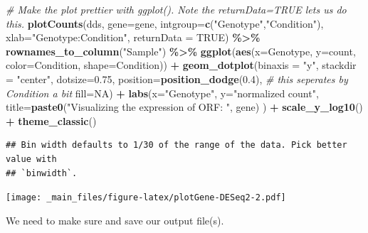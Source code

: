 \documentclass[
]{book}
\newenvironment{Shaded}{\begin{snugshade}}{\end{snugshade}}
\newcommand{\AttributeTok}[1]{\textcolor[rgb]{0.13,0.29,0.53}{#1}}
\newcommand{\CommentTok}[1]{\textcolor[rgb]{0.56,0.35,0.01}{\textit{#1}}}
\newcommand{\ConstantTok}[1]{\textcolor[rgb]{0.56,0.35,0.01}{#1}}
\newcommand{\FloatTok}[1]{\textcolor[rgb]{0.00,0.00,0.81}{#1}}
\newcommand{\FunctionTok}[1]{\textcolor[rgb]{0.13,0.29,0.53}{\textbf{#1}}}
\newcommand{\NormalTok}[1]{#1}
\newcommand{\SpecialCharTok}[1]{\textcolor[rgb]{0.81,0.36,0.00}{\textbf{#1}}}
\newcommand{\StringTok}[1]{\textcolor[rgb]{0.31,0.60,0.02}{#1}}
\begin{document}
\begin{Shaded}
\begin{Highlighting}[]
\CommentTok{\# Make the plot prettier with ggplot(). Note the returnData=TRUE let\textquotesingle{}s us do this.}
\FunctionTok{plotCounts}\NormalTok{(dds, }\AttributeTok{gene=}\NormalTok{gene, }\AttributeTok{intgroup=}\FunctionTok{c}\NormalTok{(}\StringTok{"Genotype"}\NormalTok{,}\StringTok{"Condition"}\NormalTok{),}
           \AttributeTok{xlab=}\StringTok{"Genotype:Condition"}\NormalTok{, }\AttributeTok{returnData =} \ConstantTok{TRUE}\NormalTok{) }\SpecialCharTok{\%\textgreater{}\%}
  \FunctionTok{rownames\_to\_column}\NormalTok{(}\StringTok{"Sample"}\NormalTok{) }\SpecialCharTok{\%\textgreater{}\%}
  \FunctionTok{ggplot}\NormalTok{(}\FunctionTok{aes}\NormalTok{(}\AttributeTok{x=}\NormalTok{Genotype, }\AttributeTok{y=}\NormalTok{count, }\AttributeTok{color=}\NormalTok{Condition, }\AttributeTok{shape=}\NormalTok{Condition)) }\SpecialCharTok{+}
  \FunctionTok{geom\_dotplot}\NormalTok{(}\AttributeTok{binaxis =} \StringTok{"y"}\NormalTok{, }\AttributeTok{stackdir =} \StringTok{"center"}\NormalTok{, }\AttributeTok{dotsize=}\FloatTok{0.75}\NormalTok{,}
               \AttributeTok{position=}\FunctionTok{position\_dodge}\NormalTok{(}\FloatTok{0.4}\NormalTok{), }\CommentTok{\# this seperates by Condition a bit}
               \AttributeTok{fill=}\ConstantTok{NA}\NormalTok{) }\SpecialCharTok{+}
  \FunctionTok{labs}\NormalTok{(}\AttributeTok{x=}\StringTok{"Genotype"}\NormalTok{,}
       \AttributeTok{y=}\StringTok{"normalized count"}\NormalTok{,}
       \AttributeTok{title=}\FunctionTok{paste0}\NormalTok{(}\StringTok{"Visualizing the expression of ORF: "}\NormalTok{, gene)}
\NormalTok{       ) }\SpecialCharTok{+}
  \FunctionTok{scale\_y\_log10}\NormalTok{() }\SpecialCharTok{+}
  \FunctionTok{theme\_classic}\NormalTok{()}
\end{Highlighting}
\end{Shaded}

\begin{verbatim}
## Bin width defaults to 1/30 of the range of the data. Pick better value with
## `binwidth`.
\end{verbatim}

\texttt{[image: \_main\_files/figure-latex/plotGene-DESeq2-2.pdf]}

We need to make sure and save our output file(s).
\end{document}
